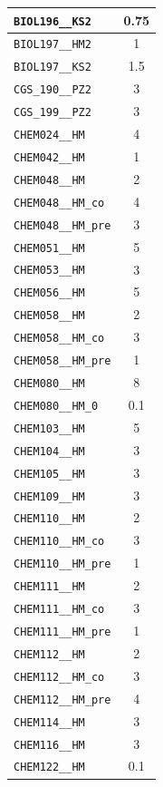 \begin{longtable}{|p{}|c|}
    \verb|BIOL196__KS2| & 0.75\\\hline
    \verb|BIOL197__HM2| & 1\\\hline
    \verb|BIOL197__KS2| & 1.5\\\hline
    \verb|CGS_190__PZ2| & 3\\\hline
    \verb|CGS_199__PZ2| & 3\\\hline
    \verb|CHEM024__HM| & 4\\\hline
    \verb|CHEM042__HM| & 1\\\hline
    \verb|CHEM048__HM| & 2\\\hline
    \verb|CHEM048__HM_co| & 4\\\hline
    \verb|CHEM048__HM_pre| & 3\\\hline
    \verb|CHEM051__HM| & 5\\\hline
    \verb|CHEM053__HM| & 3\\\hline
    \verb|CHEM056__HM| & 5\\\hline
    \verb|CHEM058__HM| & 2\\\hline
    \verb|CHEM058__HM_co| & 3\\\hline
    \verb|CHEM058__HM_pre| & 1\\\hline
    \verb|CHEM080__HM| & 8\\\hline
    \verb|CHEM080__HM_0| & 0.1\\\hline
    \verb|CHEM103__HM| & 5\\\hline
    \verb|CHEM104__HM| & 3\\\hline
    \verb|CHEM105__HM| & 3\\\hline
    \verb|CHEM109__HM| & 3\\\hline
    \verb|CHEM110__HM| & 2\\\hline
    \verb|CHEM110__HM_co| & 3\\\hline
    \verb|CHEM110__HM_pre| & 1\\\hline
    \verb|CHEM111__HM| & 2\\\hline
    \verb|CHEM111__HM_co| & 3\\\hline
    \verb|CHEM111__HM_pre| & 1\\\hline
    \verb|CHEM112__HM| & 2\\\hline
    \verb|CHEM112__HM_co| & 3\\\hline
    \verb|CHEM112__HM_pre| & 4\\\hline
    \verb|CHEM114__HM| & 3\\\hline
    \verb|CHEM116__HM| & 3\\\hline
    \verb|CHEM122__HM| & 0.1\\\hline

\end{longtable}
